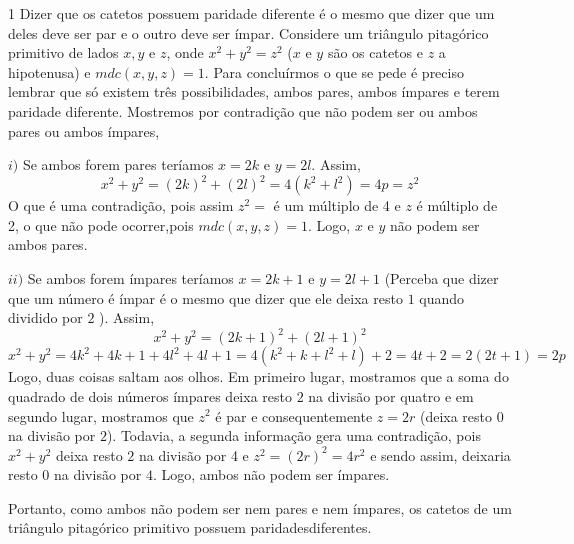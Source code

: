 \begin{solucoes}{1}
\solucao
Dizer que os catetos possuem paridade diferente é o mesmo que dizer que um deles deve ser par e o outro deve ser ímpar. Considere um triângulo pitagórico primitivo de lados $x,y$ e $z$, onde $x^2+y^2=z^2$ ($x$ e $y$ são os catetos e $z$ a hipotenusa) e $mdc(x,y,z)=1$. Para concluírmos o que se pede é preciso lembrar que só existem três possibilidades, ambos pares, ambos ímpares e terem paridade diferente. Mostremos por contradição que não podem ser ou ambos pares ou ambos ímpares,  

$i)$ Se ambos forem pares teríamos $x=2k$ e $y=2l$. Assim, 
\begin{equation*}
    x^2+y^2=(2k)^2+(2l)^2=4(k^2+l^2)=4p=z^2
\end{equation*}
O que é uma contradição, pois assim $z^2=$ é um múltiplo de 4 e $z$ é múltiplo de 2, o que não pode ocorrer,pois $mdc(x,y,z)=1$. Logo, $x$ e $y$ não podem ser ambos pares.

$ii)$ Se ambos forem ímpares teríamos $x=2k+1$ e $y=2l+1$ (Perceba que dizer que um número é ímpar é o mesmo que dizer que ele deixa resto $1$ quando dividido por $2$ ). Assim, 
\begin{equation*}
    x^2+y^2=(2k+1)^2+(2l+1)^2
\end{equation*}
\begin{equation*}
    x^2+y^2=4k^2+4k+1+4l^2+4l+1=4(k^2+k+l^2+l)+2=4t+2=2(2t+1)=2p
\end{equation*}
Logo, duas coisas saltam aos olhos. Em primeiro lugar, mostramos que a soma do quadrado de dois números ímpares deixa resto $2$ na divisão por quatro e em segundo lugar, mostramos que $z^2$ é par e consequentemente $z=2r$ (deixa resto $0$ na divisão por $2$). Todavia, a segunda informação gera uma contradição, pois $x^2+y^2$ deixa resto $2$ na divisão por 4 e $z^2=(2r)^2=4r^2$ e sendo assim, deixaria resto $0$ na divisão por $4$. Logo, ambos não podem ser ímpares.


Portanto, como ambos não podem ser nem pares e nem ímpares, os catetos de um triângulo pitagórico primitivo possuem paridadesdiferentes.
\end{solucoes}


        